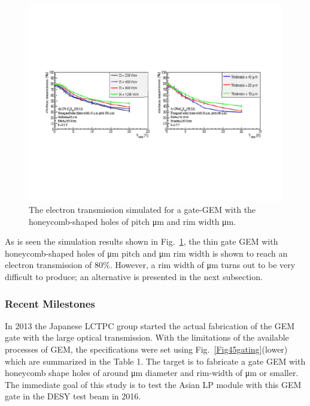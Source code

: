 \begin{figure}[htb!]
\begin{center}
\includegraphics[width=\columnwidth]{Tracker/TPC_Bonn/plots/TPC-Gate_Fig3gating.pdf}%
\caption{\label{Fig3gating} {The electron transmission simulated for a gate-GEM with the honeycomb-shaped holes of pitch \unit[100]{\micro m} and rim width \unit[10]{\micro m}.}}
\end{center}
\end{figure}

As is seen the simulation results shown in Fig.~\ref{Fig3gating}, the thin gate GEM with
honey\-comb-shaped holes of \unit[100]{\micro m} pitch and \unit[10]{\micro m} rim width is shown to reach
an electron transmission of 80\%. However, a rim width of \unit[10]{\micro m} turns out to be very difficult to produce;
an alternative is presented in the next subsection.

\subsubsection{Recent Milestones}

In 2013 the Japanese LCTPC group started the actual fabrication of the GEM gate with the large
optical transmission. With the limitations of the available processes of GEM, the specifications
were set using  Fig.~\ref{Fig45gating}(lower)
which are summarized in the Table 1. The target is to fabricate a gate GEM with  honeycomb shape holes
of around \unit[300]{\micro m} diameter and  rim-width of \unit[35]{\micro m} or smaller. The immediate goal
of this study is to test the Asian LP module with this GEM gate in the DESY test beam in 2016.

